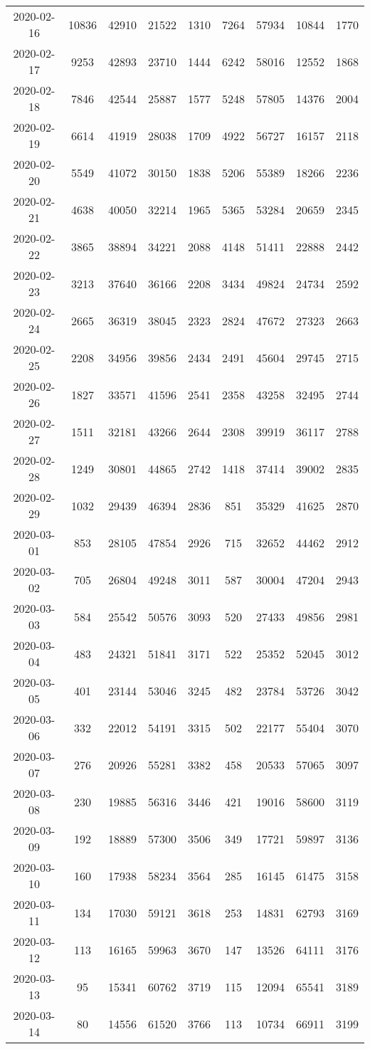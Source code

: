 \begin{longtable}{ccccccccc}
2020-02-16&10836&42910&21522&1310&7264&57934&10844&1770\\
2020-02-17&9253&42893&23710&1444&6242&58016&12552&1868\\
2020-02-18&7846&42544&25887&1577&5248&57805&14376&2004\\
2020-02-19&6614&41919&28038&1709&4922&56727&16157&2118\\
2020-02-20&5549&41072&30150&1838&5206&55389&18266&2236\\
2020-02-21&4638&40050&32214&1965&5365&53284&20659&2345\\
2020-02-22&3865&38894&34221&2088&4148&51411&22888&2442\\
2020-02-23&3213&37640&36166&2208&3434&49824&24734&2592\\
2020-02-24&2665&36319&38045&2323&2824&47672&27323&2663\\
2020-02-25&2208&34956&39856&2434&2491&45604&29745&2715\\
2020-02-26&1827&33571&41596&2541&2358&43258&32495&2744\\
2020-02-27&1511&32181&43266&2644&2308&39919&36117&2788\\
2020-02-28&1249&30801&44865&2742&1418&37414&39002&2835\\
2020-02-29&1032&29439&46394&2836&851&35329&41625&2870\\
2020-03-01&853&28105&47854&2926&715&32652&44462&2912\\
2020-03-02&705&26804&49248&3011&587&30004&47204&2943\\
2020-03-03&584&25542&50576&3093&520&27433&49856&2981\\
2020-03-04&483&24321&51841&3171&522&25352&52045&3012\\
2020-03-05&401&23144&53046&3245&482&23784&53726&3042\\
2020-03-06&332&22012&54191&3315&502&22177&55404&3070\\
2020-03-07&276&20926&55281&3382&458&20533&57065&3097\\
2020-03-08&230&19885&56316&3446&421&19016&58600&3119\\
2020-03-09&192&18889&57300&3506&349&17721&59897&3136\\
2020-03-10&160&17938&58234&3564&285&16145&61475&3158\\
2020-03-11&134&17030&59121&3618&253&14831&62793&3169\\
2020-03-12&113&16165&59963&3670&147&13526&64111&3176\\
2020-03-13&95&15341&60762&3719&115&12094&65541&3189\\
2020-03-14&80&14556&61520&3766&113&10734&66911&3199\\

\end{longtable}
